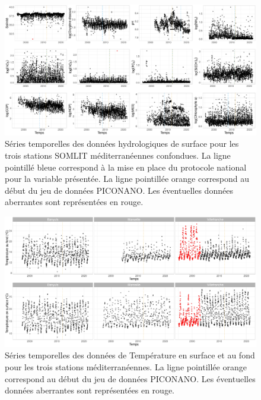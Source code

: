 \documentclass[12pt]{article}
\begin{document}
\begin{figure}
\centering
\includegraphics[width=\textwidth]{fig/MM_visualisation_hydro.pdf}
\caption{Séries temporelles des données hydrologiques de surface pour les trois stations SOMLIT méditerranéennes confondues. La ligne pointillé bleue correspond à la mise en place du protocole national pour la variable présentée. La ligne pointillée orange correspond au début du jeu de données PICONANO. Les éventuelles données aberrantes sont représentées en rouge.}
\end{figure}

\begin{figure}
\centering
\includegraphics[width=.9\textwidth]{fig/MM_visualisation_T.pdf}
\caption{Séries temporelles des données de Température en surface et au fond pour les trois stations méditerranéennes. La ligne pointillée orange correspond au début du jeu de données PICONANO. Les éventuelles données aberrantes sont représentées en rouge.}
\end{figure}
\end{document}
